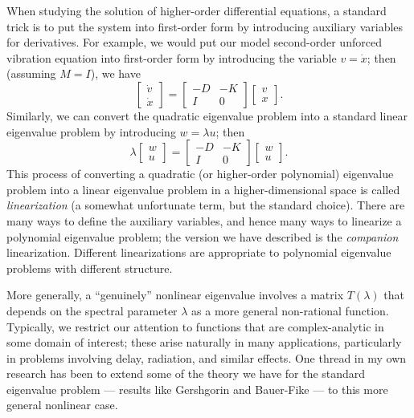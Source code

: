 When studying the solution of higher-order differential equations,
a standard trick is to put the system into first-order form by
introducing auxiliary variables for derivatives.  For example,
we would put our model second-order unforced vibration equation
into first-order form by introducing the variable $v = \dot{x}$;
then (assuming $M = I$), we have
\[
  \begin{bmatrix} \dot{v} \\ \dot{x} \end{bmatrix} =
  \begin{bmatrix} -D & -K \\ I & 0 \end{bmatrix}
  \begin{bmatrix} v \\ x \end{bmatrix}.
\]
Similarly, we can convert the quadratic eigenvalue problem into
a standard linear eigenvalue problem by introducing $w = \lambda u$;
then
\[
  \lambda \begin{bmatrix} w \\ u \end{bmatrix} =
  \begin{bmatrix} -D & -K \\ I & 0 \end{bmatrix}
  \begin{bmatrix} w \\ u \end{bmatrix}.
\]
This process of converting a quadratic (or higher-order polynomial)
eigenvalue problem into a linear eigenvalue problem in a higher-dimensional
space is called {\em linearization} (a somewhat unfortunate term, but the
standard choice).  There are many ways to define the auxiliary variables,
and hence many ways to linearize a polynomial eigenvalue problem; the version
we have described is the {\em companion} linearization.  Different
linearizations are appropriate to polynomial eigenvalue problems with
different structure.

More generally, a ``genuinely'' nonlinear eigenvalue involves
a matrix $T(\lambda)$ that depends on the spectral parameter $\lambda$
as a more general non-rational function.  Typically, we restrict our
attention to functions that are complex-analytic in some domain of
interest; these arise naturally in many applications, particularly
in problems involving delay, radiation, and similar effects.  One
thread in my own research has been to extend some of the theory we
have for the standard eigenvalue problem --- results like Gershgorin
and Bauer-Fike --- to this more general nonlinear case.

